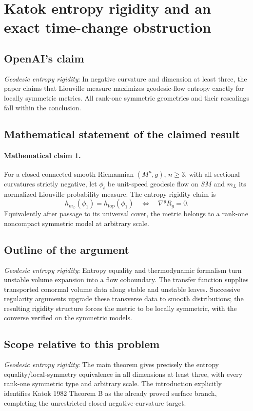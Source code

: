 \documentclass[11pt]{article}
\begin{document}
\section*{Katok entropy rigidity and an exact time-change obstruction}

\subsection{OpenAI's claim}
\textit{Geodesic entropy rigidity}: In negative curvature and dimension at least three, the paper claims that Liouville measure maximizes geodesic-flow entropy exactly for locally symmetric metrics. All rank-one symmetric geometries and their rescalings fall within the conclusion.

\subsection{Mathematical statement of the claimed result}
\paragraph{Mathematical claim 1.} For a closed connected smooth Riemannian $(M^n,g)$, $n\ge3$, with all sectional curvatures strictly negative, let $\phi_t$ be unit-speed geodesic flow on $SM$ and $m_L$ its normalized Liouville probability measure. The entropy-rigidity claim is \[h_{m_L}(\phi_1)=h_{\mathrm{top}}(\phi_1)\quad\Longleftrightarrow\quad\nabla^gR_g=0.\] Equivalently after passage to its universal cover, the metric belongs to a rank-one noncompact symmetric model at arbitrary scale.

\subsection{Outline of the argument}
\textit{Geodesic entropy rigidity}: Entropy equality and thermodynamic formalism turn unstable volume expansion into a flow coboundary. The transfer function supplies transported conormal volume data along stable and unstable leaves. Successive regularity arguments upgrade these transverse data to smooth distributions; the resulting rigidity structure forces the metric to be locally symmetric, with the converse verified on the symmetric models.

\subsection{Scope relative to this problem}
\textit{Geodesic entropy rigidity}: The main theorem gives precisely the entropy equality/local-symmetry equivalence in all dimensions at least three, with every rank-one symmetric type and arbitrary scale. The introduction explicitly identifies Katok 1982 Theorem B as the already proved surface branch, completing the unrestricted closed negative-curvature target.
\end{document}
